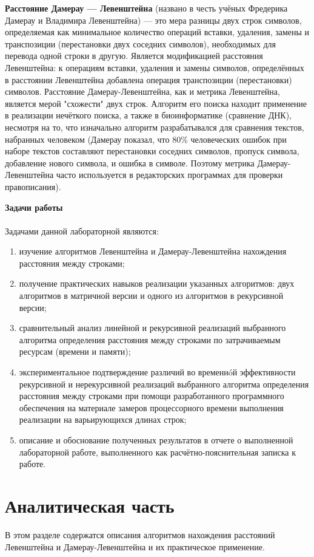 \documentclass[a4paper,12pt]{report}
\begin{document}
\textbf{Расстояние Дамерау — Левенштейна} (названо в честь учёных Фредерика Дамерау и Владимира Левенштейна) — это мера разницы двух строк символов, определяемая как минимальное количество операций вставки, удаления, замены и транспозиции (перестановки двух соседних символов), необходимых для перевода одной строки в другую. Является модификацией расстояния Левенштейна: к операциям вставки, удаления и замены символов, определённых в расстоянии Левенштейна добавлена операция транспозиции (перестановки) символов. Расстояние Дамерау-Левенштейна, как и метрика Левенштейна, является мерой "схожести" двух строк. Алгоритм его поиска находит применение в реализации нечёткого поиска, а также в биоинформатике (сравнение ДНК), несмотря на то, что изначально алгоритм разрабатывался для сравнения текстов, набранных человеком (Дамерау показал, что 80\% человеческих ошибок при наборе текстов составляют перестановки соседних символов, пропуск символа, добавление нового символа, и ошибка в символе. Поэтому метрика Дамерау-Левенштейна часто используется в редакторских программах для проверки правописания).

\newpage
\textbf{\LARGE Задачи работы}\\\\
Задачами данной лабораторной являются:
\begin{enumerate}
  	\item изучение алгоритмов Левенштейна и Дамерау-Левенштейна нахождения расстояния между строками;
	\item получение практических навыков реализации указанных алгоритмов: двух алгоритмов в матричной версии и одного из алгоритмов в рекурсивной версии; 
	\item сравнительный анализ линейной и рекурсивной реализаций выбранного алгоритма определения расстояния между строками по затрачиваемым ресурсам (времени и памяти); 
	\item экспериментальное подтверждение различий во временнóй эффективности рекурсивной и
нерекурсивной реализаций выбранного алгоритма определения расстояния между строками при
помощи разработанного программного обеспечения на материале замеров процессорного времени
выполнения реализации на варьирующихся длинах строк; 
	\item описание и обоснование полученных результатов в отчете о выполненной лабораторной
работе, выполненного как расчётно-пояснительная записка к работе. 
\end{enumerate}


\chapter{Аналитическая часть}
В этом разделе содержатся описания алгоритмов нахождения расстояний Левенштейна и Дамерау-Левенштейна и их практическое применение.
\end{document}
